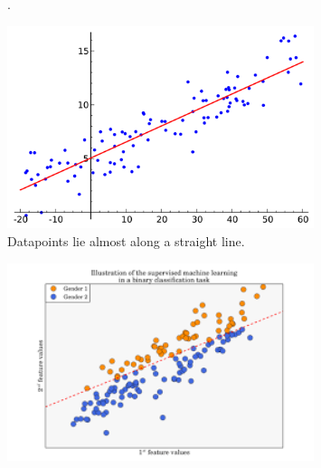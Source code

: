 \documentclass[]{article}
\begin{document}
{\begin{figure}[htbp]
	\caption{.}
	
	\label{fig:data_plot}
\end{figure}

\begin{figure}[htbp]
	\centering
	
	\includegraphics[width=0.8\textwidth]{lin-reg.png}
	
	\caption{Datapoints lie almost along a straight line.}
	
	\label{fig:linreg_plot}
\end{figure}
\begin{figure}[htbp]
	\centering
	
	\includegraphics[width=0.8\textwidth]{log-reg.png}
	

\end{figure}}
\end{document}
